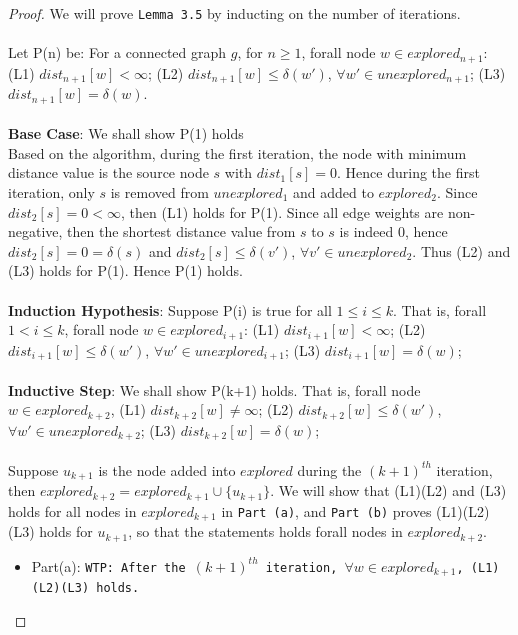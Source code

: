 \documentclass[11pt, oneside]{article}   	%
\newcommand\tab[1][1cm]{\hspace*{#1}}
\theoremstyle{definition}
\begin{document}
\begin{proof}
We will prove \texttt{Lemma 3.5} by inducting on the number of iterations. 
\\\\
Let P(n) be: For a connected graph $g$, for $n \geq 1$, forall node $w \in explored_{n+1}$: (L1) $dist_{n+1}[w] < \infty$; (L2) $dist_{n+1}[w] \leq \delta(w')$, $\forall w' \in unexplored_{n+1}$; (L3) $dist_{n+1}[w] = \delta(w)$. 
\tab\\\\
\textbf{Base Case}: We shall show P(1) holds \\
Based on the algorithm, during the first iteration, the node with minimum distance value is the source node $s$ with $dist_1[s] = 0$. Hence during the first iteration, only $s$ is removed from $unexplored_1$ and added to $explored_2$. Since $dist_2[s] = 0 < \infty$, then (L1) holds for P(1). Since all edge weights are non-negative, then the shortest distance value from $s$ to $s$ is indeed $0$, hence $dist_2[s] = 0 = \delta(s)$ and $dist_2[s] \leq \delta(v')$, $\forall v' \in unexplored_2$. Thus (L2) and (L3) holds for P(1). Hence P(1) holds.
\\\\
\textbf{Induction Hypothesis}: Suppose P(i) is true for all $1 \leq i \leq k$. That is, forall $1 < i \leq k$, forall node $w \in explored_{i+1}$: (L1) $dist_{i+1}[w] < \infty$; (L2) $dist_{i+1}[w] \leq \delta(w')$, $\forall w' \in unexplored_{i+1}$; (L3) $dist_{i+1}[w] = \delta(w)$; 
\\\\
\textbf{Inductive Step}: We shall show P(k+1) holds. That is, forall node $w \in explored_{k+2}$, (L1) $dist_{k+2}[w] \neq \infty$; (L2) $dist_{k+2}[w]\leq \delta(w')$, $\forall w' \in unexplored_{k+2}$; (L3) $dist_{k+2}[w] = \delta(w)$;
\\\\
Suppose $u_{k+1}$ is the node added into $explored$ during the $(k+1)^{th}$ iteration, then $explored_{k+2} = explored_{k+1} \cup \{u_{k+1}\}$. We will show that (L1)(L2) and (L3) holds for all nodes in $explored_{k+1}$ in \texttt{Part (a)}, and \texttt{Part (b)} proves (L1)(L2)(L3) holds for $u_{k+1}$, so that the statements holds forall nodes in $explored_{k+2}$. 
\begin{itemize}
  \item Part(a): \texttt{WTP: After the $(k+1)^{th}$ iteration, $\forall w \in explored_{k+1}$, (L1)(L2)(L3) holds.} 

\end{itemize}
\end{proof}
\end{document}
